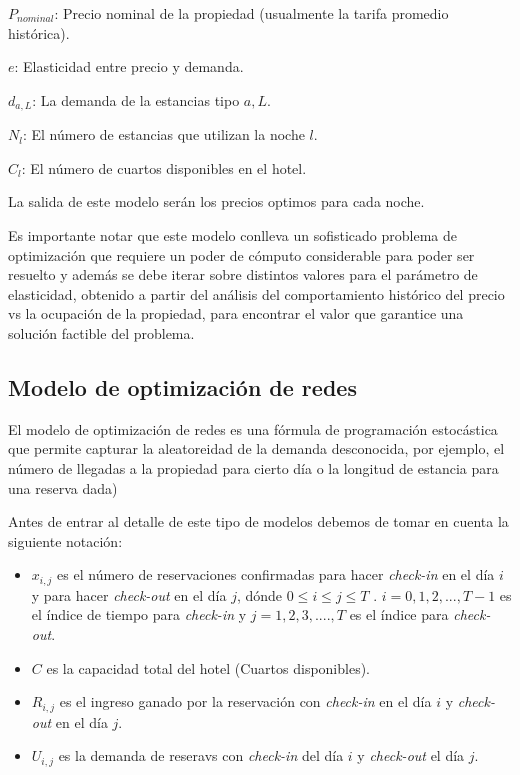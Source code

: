 {{{$P_{nominal}$: Precio nominal de la propiedad (usualmente la tarifa promedio histórica).

$e$: Elasticidad entre precio y demanda.

$d_{a,L}$: La demanda de la estancias tipo $a,L$.

$N_l$: El número de estancias que utilizan la noche $l$.

$C_l$: El número de cuartos disponibles en el hotel.

La salida de este modelo serán los precios optimos para cada noche. 

Es importante notar que este modelo conlleva un sofisticado problema de optimización que requiere un poder de cómputo considerable para poder ser resuelto y además se debe iterar sobre distintos valores para el parámetro de elasticidad, obtenido a partir del análisis del comportamiento histórico del precio vs la ocupación de la propiedad, para encontrar el valor que garantice una solución factible del problema.


\subsection*{Modelo de optimización de redes}

El modelo de optimización de redes es una fórmula de programación estocástica que permite capturar la aleatoreidad de la demanda desconocida, por ejemplo, el número de llegadas a la propiedad para cierto día o la longitud de estancia para una reserva dada)

Antes de entrar al detalle de este tipo de modelos debemos de tomar en cuenta la siguiente notación:

\begin{itemize}
  \item $x_{i,j}$ es el número de reservaciones confirmadas para hacer \emph{check-in} en el día $i$ y para hacer \emph{check-out} en el día $j$, dónde $0\leq i \leq j \leq T$ . $i={0,1,2,...,T-1}$ es el índice de tiempo para \emph{check-in} y $j={1,2,3,....,T}$ es el índice para \emph{check-out}.
  \item $C$ es la capacidad total del hotel (Cuartos disponibles).
  \item $R_{i,j}$ es el ingreso ganado por la reservación con \emph{check-in} en el día $i$ y \emph{check-out} en el día $j$.
  \item $U_{i,j}$ es la demanda de reseravs con \emph{check-in} del día $i$ y \emph{check-out} el día $j$.
\end{itemize}

}}}
